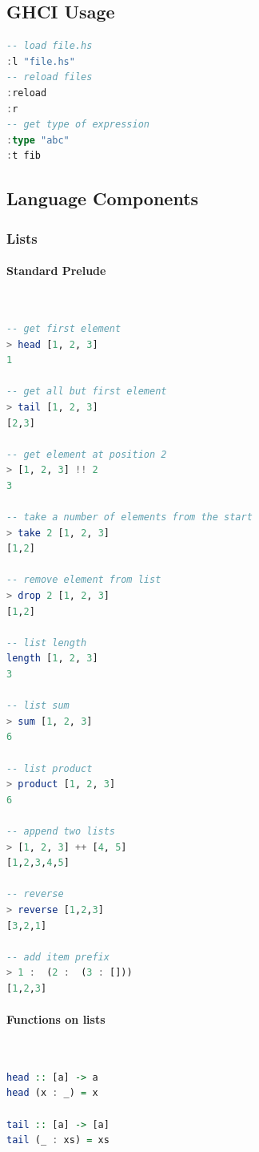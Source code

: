 \subsection{GHCI Usage}
\begin{lstlisting}[language=haskell]
-- load file.hs
:l "file.hs"
-- reload files
:reload
:r
-- get type of expression
:type "abc"
:t fib
\end{lstlisting}

\subsection{Language Components}

\subsubsection{Lists}

\paragraph{Standard Prelude}  \hfill \\
\begin{lstlisting}[language=haskell]
-- get first element
> head [1, 2, 3]
1

-- get all but first element
> tail [1, 2, 3]
[2,3]

-- get element at position 2
> [1, 2, 3] !! 2
3

-- take a number of elements from the start
> take 2 [1, 2, 3]
[1,2]

-- remove element from list
> drop 2 [1, 2, 3]
[1,2]

-- list length
length [1, 2, 3]
3

-- list sum
> sum [1, 2, 3]
6

-- list product
> product [1, 2, 3]
6

-- append two lists
> [1, 2, 3] ++ [4, 5]
[1,2,3,4,5]

-- reverse
> reverse [1,2,3]
[3,2,1]

-- add item prefix
> 1 :  (2 :  (3 : []))
[1,2,3]
\end{lstlisting}

\paragraph{Functions on lists} \hfill \\
\begin{lstlisting}[language=Haskell]
head :: [a] -> a
head (x : _) = x

tail :: [a] -> [a]
tail (_ : xs) = xs
\end{lstlisting}

